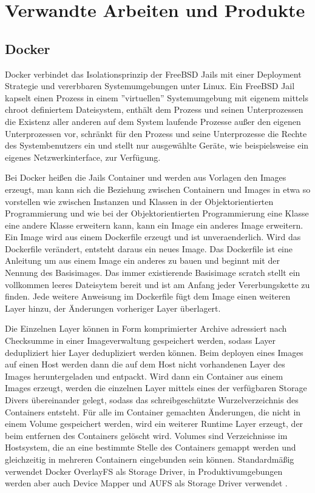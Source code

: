 \section{Verwandte Arbeiten und Produkte}
\label{sec:related-work}


\subsection{Docker}
Docker verbindet das Isolationsprinzip der FreeBSD Jails mit einer Deployment
Strategie und vererbbaren Systemumgebungen unter Linux.
Ein FreeBSD Jail kapselt einen Prozess in einem ''virtuellen'' Systemumgebung
mit eigenem mittels chroot definiertem Dateisystem, enthält dem Prozess und
seinen Unterprozessen die Existenz aller anderen auf dem System laufende
Prozesse außer den eigenen Unterprozessen vor, schränkt für den Prozess und
seine Unterprozesse die Rechte des Systembenutzers ein und stellt nur
ausgewählte Geräte, wie beispielsweise ein eigenes Netzwerkinterface, zur
Verfügung. \cite{FreeBSD-Jail-doc} \cite{FreeBSD-Jail-developer-comments} \cite{FreeBSD-Jail-paper}

Bei Docker heißen die Jails Container und werden aus Vorlagen den Images
erzeugt, man kann sich die Beziehung zwischen Containern und Images in etwa so
vorstellen wie zwischen Instanzen und Klassen in der Objektorientierten
Programmierung und wie bei der Objektorientierten Programmierung eine Klasse
eine andere Klasse erweitern kann, kann ein Image ein anderes Image erweitern.
Ein Image wird aus einem Dockerfile erzeugt und ist unveraenderlich. Wird das
Dockerfile verändert, entsteht daraus ein neues Image. Das Dockerfile ist eine
Anleitung um aus einem Image ein anderes zu bauen und beginnt mit der Nennung
des Basisimages. Das immer existierende Basisimage scratch stellt ein vollkommen
leeres Dateisytem bereit und ist am Anfang jeder Vererbungskette zu finden. Jede
weitere Anweisung im Dockerfile fügt dem Image einen weiteren Layer hinzu, der
Änderungen vorheriger Layer überlagert.

Die Einzelnen Layer können in Form komprimierter Archive adressiert nach
Checksumme in einer Imageverwaltung gespeichert werden, sodass Layer
dedupliziert hier Layer dedupliziert werden können. Beim deployen eines Images
auf einen Host werden dann die auf dem Host nicht vorhandenen Layer des Images
heruntergeladen und entpackt. Wird dann ein Container aus einem Images erzeugt,
werden die einzelnen Layer mittels eines der verfügbaren Storage Divers
übereinander gelegt, sodass das schreibgeschützte Wurzelverzeichnis des
Containers entsteht. Für alle im Container gemachten Änderungen, die nicht in
einem Volume gespeichert werden, wird ein weiterer Runtime Layer erzeugt, der
beim entfernen des Containers gelöscht wird. Volumes sind Verzeichnisse im
Hostsystem, die an eine bestimmte Stelle des Containers gemappt werden und
gleichzeitig in mehreren Containern eingebunden sein können. Standardmäßig
verwendet Docker OverlayFS als Storage Driver, in Produktivumgebungen werden
aber auch Device Mapper und AUFS als Storage Driver verwendet \cite{docker-storage-driver}.


